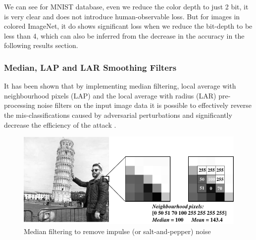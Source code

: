 We can see for MNIST database, even we reduce the color depth to just 2 bit, it is very clear and does not introduce human-observable loss. But for images in colored ImageNet, it do shows significant loss when we reduce the bit-depth to be less than 4, which can also be inferred from the decrease in the accuracy in the following results section. 


\subsubsection{Median, LAP and LAR Smoothing Filters}
It has been shown that by implementing median filtering, local average with neighbourhood pixels (LAP) and the local average with radius (LAR) pre-processing noise filters on the input image data it is possible to effectively reverse the mis-classifications caused by adversarial perturbations and significantly decrease the efficiency of the attack \cite{khalid2019fademl}. 

\begin{figure}[h!]
	\centering
		\includegraphics[width=.72\textwidth]{Diagram1-cropped.pdf}
		
	\caption{Median filtering to remove impulse (or salt-and-pepper) noise}
	\label{fig: Median}
\end{figure}



